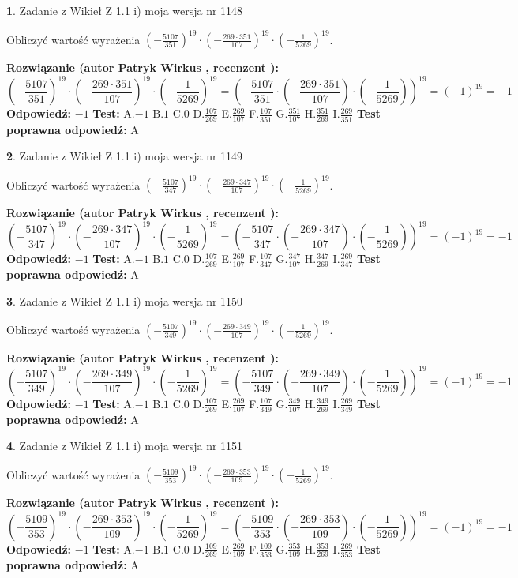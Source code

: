 \documentclass[12pt, a4paper]{article}
\theoremstyle{definition} %
\newtheorem{zad}{}
\newcommand{\zadStart}[1]{\begin{zad}#1\newline}
\newcommand{\zadStop}{\end{zad}}
\newcommand{\rozwStart}[2]{\noindent \textbf{Rozwiązanie (autor #1 , recenzent #2): }\newline}
\newcommand{\rozwStop}{\newline}
\newcommand{\odpStart}{\noindent \textbf{Odpowiedź:}\newline}
\newcommand{\odpStop}{\newline}
\newcommand{\testStart}{\noindent \textbf{Test:}\newline}
\newcommand{\testStop}{\newline}
\newcommand{\kluczStart}{\noindent \textbf{Test poprawna odpowiedź:}\newline}
\newcommand{\kluczStop}{\newline}
\begin{document}
\zadStart{Zadanie z Wikieł Z 1.1 i) moja wersja nr 1148}

Obliczyć wartość wyrażenia $(-\frac{5107}{351})^{19} \cdot (-\frac{269 \cdot 351}{107})^{19} \cdot (-\frac{1}{5269})^{19}$.
\zadStop
\rozwStart{Patryk Wirkus}{}
$$(-\frac{5107}{351})^{19} \cdot (-\frac{269 \cdot 351}{107})^{19} \cdot (-\frac{1}{5269})^{19} = (-\frac{5107}{351} \cdot (-\frac{269 \cdot 351}{107}) \cdot (-\frac{1}{5269}))^{19} = (-1)^{19} = -1$$
\rozwStop
\odpStart
$-1$
\odpStop
\testStart
A.$-1$ B.$1$ C.$0$ D.$\frac{107}{269}$ E.$\frac{269}{107}$
F.$\frac{107}{351}$ G.$\frac{351}{107}$
H.$\frac{351}{269}$
I.$\frac{269}{351}$
\testStop
\kluczStart
A
\kluczStop



\zadStart{Zadanie z Wikieł Z 1.1 i) moja wersja nr 1149}

Obliczyć wartość wyrażenia $(-\frac{5107}{347})^{19} \cdot (-\frac{269 \cdot 347}{107})^{19} \cdot (-\frac{1}{5269})^{19}$.
\zadStop
\rozwStart{Patryk Wirkus}{}
$$(-\frac{5107}{347})^{19} \cdot (-\frac{269 \cdot 347}{107})^{19} \cdot (-\frac{1}{5269})^{19} = (-\frac{5107}{347} \cdot (-\frac{269 \cdot 347}{107}) \cdot (-\frac{1}{5269}))^{19} = (-1)^{19} = -1$$
\rozwStop
\odpStart
$-1$
\odpStop
\testStart
A.$-1$ B.$1$ C.$0$ D.$\frac{107}{269}$ E.$\frac{269}{107}$
F.$\frac{107}{347}$ G.$\frac{347}{107}$
H.$\frac{347}{269}$
I.$\frac{269}{347}$
\testStop
\kluczStart
A
\kluczStop



\zadStart{Zadanie z Wikieł Z 1.1 i) moja wersja nr 1150}

Obliczyć wartość wyrażenia $(-\frac{5107}{349})^{19} \cdot (-\frac{269 \cdot 349}{107})^{19} \cdot (-\frac{1}{5269})^{19}$.
\zadStop
\rozwStart{Patryk Wirkus}{}
$$(-\frac{5107}{349})^{19} \cdot (-\frac{269 \cdot 349}{107})^{19} \cdot (-\frac{1}{5269})^{19} = (-\frac{5107}{349} \cdot (-\frac{269 \cdot 349}{107}) \cdot (-\frac{1}{5269}))^{19} = (-1)^{19} = -1$$
\rozwStop
\odpStart
$-1$
\odpStop
\testStart
A.$-1$ B.$1$ C.$0$ D.$\frac{107}{269}$ E.$\frac{269}{107}$
F.$\frac{107}{349}$ G.$\frac{349}{107}$
H.$\frac{349}{269}$
I.$\frac{269}{349}$
\testStop
\kluczStart
A
\kluczStop



\zadStart{Zadanie z Wikieł Z 1.1 i) moja wersja nr 1151}

Obliczyć wartość wyrażenia $(-\frac{5109}{353})^{19} \cdot (-\frac{269 \cdot 353}{109})^{19} \cdot (-\frac{1}{5269})^{19}$.
\zadStop
\rozwStart{Patryk Wirkus}{}
$$(-\frac{5109}{353})^{19} \cdot (-\frac{269 \cdot 353}{109})^{19} \cdot (-\frac{1}{5269})^{19} = (-\frac{5109}{353} \cdot (-\frac{269 \cdot 353}{109}) \cdot (-\frac{1}{5269}))^{19} = (-1)^{19} = -1$$
\rozwStop
\odpStart
$-1$
\odpStop
\testStart
A.$-1$ B.$1$ C.$0$ D.$\frac{109}{269}$ E.$\frac{269}{109}$
F.$\frac{109}{353}$ G.$\frac{353}{109}$
H.$\frac{353}{269}$
I.$\frac{269}{353}$
\testStop
\kluczStart
A
\kluczStop
\end{document}

